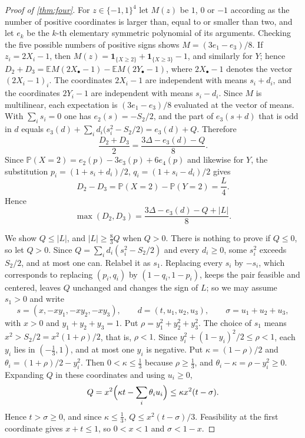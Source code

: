 \documentclass[11pt,a4paper]{article}
\numberwithin{equation}{section}
\theoremstyle{remark}
\newcommand{\Pp}{\mathbb P}
\newcommand{\E}{\mathbb E}
\begin{document}
\begin{proof}[Proof of \cref{thm:four}]
For $z\in\{-1,1\}^4$ let $M(z)$ be $1$, $0$ or $-1$ according as the number of positive coordinates is larger than, equal to or smaller than two, and let $e_k$ be the $k$-th elementary symmetric polynomial of its arguments. Checking the five possible numbers of positive signs shows $M=(3e_1-e_3)/8$. If $z_i=2X_i-1$, then $M(z)=\mathbf 1_{\{X\ge2\}}+\mathbf 1_{\{X\ge3\}}-1$, and similarly for $Y$; hence $D_2+D_3=\E M(2X_\bullet-1)-\E M(2Y_\bullet-1)$, where $2X_\bullet-1$ denotes the vector $(2X_i-1)_i$. The coordinates $2X_i-1$ are independent with means $s_i+d_i$, and the coordinates $2Y_i-1$ are independent with means $s_i-d_i$. Since $M$ is multilinear, each expectation is $(3e_1-e_3)/8$ evaluated at the vector of means. With $\sum_is_i=0$ one has $e_2(s)=-S_2/2$, and the part of $e_3(s+d)$ that is odd in $d$ equals $e_3(d)+\sum_id_i\bigl(s_i^2-S_2/2\bigr)=e_3(d)+Q$. Therefore
\begin{equation}\label{eq:avg4}
\frac{D_2+D_3}2=\frac{3\Delta-e_3(d)-Q}8 .
\end{equation}
Since $\Pp(X=2)=e_2(p)-3e_3(p)+6e_4(p)$ and likewise for $Y$, the substitution $p_i=(1+s_i+d_i)/2$, $q_i=(1+s_i-d_i)/2$ gives
\begin{equation}\label{eq:diff4}
D_2-D_3=\Pp(X=2)-\Pp(Y=2)=\frac L4 .
\end{equation}
Hence
\begin{equation}\label{eq:max4}
\max(D_2,D_3)=\frac{3\Delta-e_3(d)-Q+|L|}8 .
\end{equation}

We show $Q\le|L|$, and $|L|\ge\frac83Q$ when $Q>0$. There is nothing to prove if $Q\le0$, so let $Q>0$. Since $Q=\sum_id_i(s_i^2-S_2/2)$ and every $d_i\ge0$, some $s_i^2$ exceeds $S_2/2$, and at most one can. Relabel it as $s_1$. Replacing every $s_i$ by $-s_i$, which corresponds to replacing $(p_i,q_i)$ by $(1-q_i,1-p_i)$, keeps the pair feasible and centered, leaves $Q$ unchanged and changes the sign of $L$; so we may assume $s_1>0$ and write
\[
s=(x,-xy_1,-xy_2,-xy_3),\qquad d=(t,u_1,u_2,u_3),\qquad \sigma=u_1+u_2+u_3,
\]
with $x>0$ and $y_1+y_2+y_3=1$. Put $\rho=y_1^2+y_2^2+y_3^2$. The choice of $s_1$ means $x^2>S_2/2=x^2(1+\rho)/2$, that is, $\rho<1$. Since $y_i^2+(1-y_i)^2/2\le\rho<1$, each $y_i$ lies in $(-\frac13,1)$, and at most one $y_i$ is negative. Put $\kappa=(1-\rho)/2$ and $\theta_i=(1+\rho)/2-y_i^2$. Then $0<\kappa\le\frac13$ because $\rho\ge\frac13$, and $\theta_i-\kappa=\rho-y_i^2\ge0$. Expanding $Q$ in these coordinates and using $u_i\ge0$,
\begin{equation}\label{eq:Q}
Q=x^2\Bigl(\kappa t-\sum_i\theta_iu_i\Bigr)\le\kappa x^2(t-\sigma).
\end{equation}
Hence $t>\sigma\ge0$, and since $\kappa\le\frac13$, $Q\le x^2(t-\sigma)/3$. Feasibility at the first coordinate gives $x+t\le1$, so $0<x<1$ and $\sigma<1-x$.


\end{proof}
\end{document}
